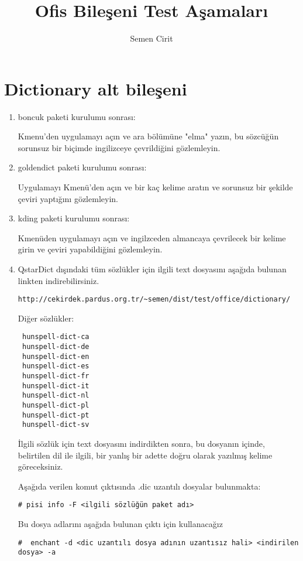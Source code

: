 \documentclass[a4paper,10pt]{article}
\title{Ofis Bileşeni Test Aşamaları}
\author{Semen Cirit}
\begin{document}
\maketitle
\section{Dictionary alt bileşeni}
\begin{enumerate}
 \item boncuk paketi kurulumu sonrası:

Kmenu'den uygulamayı açın ve ara bölümüne "elma" yazın, bu sözcüğün sorunsuz bir biçimde ingilizceye çevrildiğini gözlemleyin.

\item goldendict paketi kurulumu sonrası:

Uygulamayı Kmenü'den açın ve bir kaç kelime aratın ve sorunsuz bir şekilde çeviri yaptığını gözlemleyin.

 \item kding paketi kurulumu sonrası:

Kmenüden uygulamayı açın ve ingilzceden almancaya çevrilecek bir kelime girin ve çeviri yapabildiğini gözlemleyin.
 \item QstarDict dışındaki tüm sözlükler için ilgili text dosyasını aşağıda bulunan linkten indirebilirsiniz.
\begin{verbatim}
http://cekirdek.pardus.org.tr/~semen/dist/test/office/dictionary/
\end{verbatim}

Diğer sözlükler:
\begin{verbatim}
 hunspell-dict-ca
 hunspell-dict-de
 hunspell-dict-en
 hunspell-dict-es
 hunspell-dict-fr
 hunspell-dict-it
 hunspell-dict-nl
 hunspell-dict-pl
 hunspell-dict-pt
 hunspell-dict-sv
\end{verbatim}

İlgili sözlük için text dosyasını indirdikten sonra, bu dosyanın içinde, belirtilen dil ile ilgili, bir yanlış bir adette doğru olarak yazılmış kelime göreceksiniz.

Aşağıda verilen komut çıktısında .dic uzantılı dosyalar bulunmakta:
\begin{verbatim}
# pisi info -F <ilgili sözlüğün paket adı> 
\end{verbatim}

Bu dosya adlarını aşağıda bulunan çıktı için kullanacağız
\begin{verbatim}
#  enchant -d <dic uzantılı dosya adının uzantısız hali> <indirilen dosya> -a
\end{verbatim}


\end{enumerate}
\end{document}

